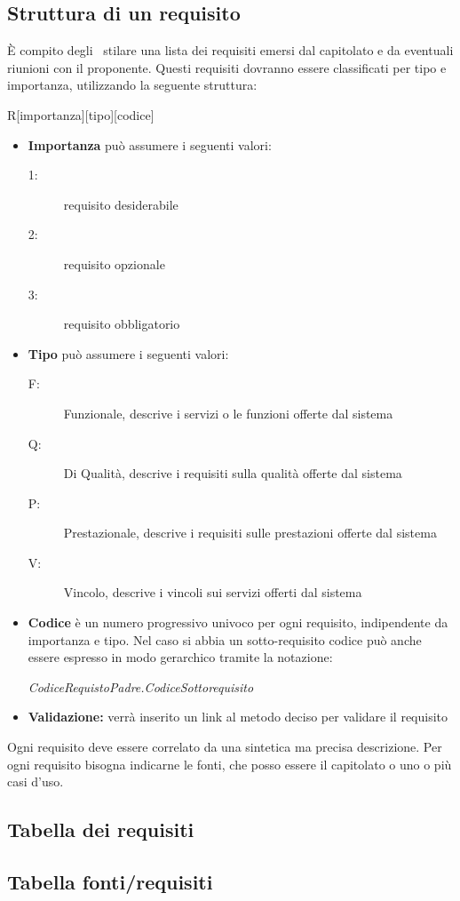 \documentclass[12pt,a4paper]{article}
\begin{document}
\subsection{Struttura di un requisito}
È compito degli \ANpl\ stilare una lista dei requisiti emersi dal capitolato e da eventuali riunioni con il proponente. Questi requisiti dovranno essere classificati per tipo e importanza, utilizzando la seguente struttura:
\begin{center}
	R[importanza][tipo][codice]
\end{center}
\begin{itemize}
	\item \textbf{Importanza} può assumere i seguenti valori:
	\begin{description}
		\item[1:] requisito desiderabile
		\item[2:] requisito opzionale
		\item[3:] requisito obbligatorio
	\end{description}
	\item \textbf{Tipo} può assumere i seguenti valori:
	\begin{description}
		\item[F:] Funzionale, descrive i servizi o le funzioni offerte dal sistema
		\item[Q:] Di Qualità, descrive i requisiti sulla qualità offerte dal sistema
		\item[P:] Prestazionale, descrive i requisiti sulle prestazioni offerte dal sistema
		\item[V:] Vincolo, descrive i vincoli sui servizi offerti dal sistema
	\end{description}
	\item \textbf{Codice} è un numero progressivo univoco per ogni requisito, indipendente da importanza e tipo. Nel caso si abbia un sotto-requisito codice può anche essere espresso in modo gerarchico tramite la notazione:
	\begin{center}
		\textit{CodiceRequistoPadre.CodiceSottorequisito}
	\end{center}
	\item \textbf{Validazione:} verrà inserito un link al metodo deciso per validare il requisito
\end{itemize}
Ogni requisito deve essere correlato da una sintetica ma precisa descrizione. Per ogni requisito bisogna indicarne le fonti, che posso essere il capitolato o uno o più casi d'uso.
\newpage
\subsection{Tabella dei requisiti}



\newpage
\subsection{Tabella fonti/requisiti}


\end{document}
